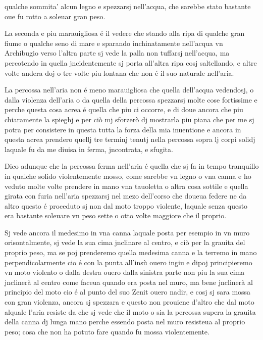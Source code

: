 \documentclass[11pt,a4paper]{article}
\begin{document}

qualche sommita' alcun legno e spezzarsj nell'acqua, che sarebbe stato bastante oue fu rotto a soleuar gran peso.

La seconda e piu marauigliosa é il vedere che stando alla ripa di qualche gran fiume o qualche seno di mare e sparando inchinatamente nell'acqua vn Archibugio verso l'altra parte sj vede la palla non tuffarsj nell'acqua, ma percotendo in quella jncidentemente sj porta all'altra ripa cosj saltellando, e altre volte andera doj o tre volte piu lontana che non é il suo naturale nell'aria.

La percossa nell'aria non é meno marauigliosa che quella dell'acqua vedendosj, o dalla violenza dell'aria o da quella della percossa spezzarsj molte cose fortissime e perche questa cosa \struck{\ill{}} acrea é quella che piu ci occorre, e di doue ancora che piu chiaramente la spieghj e per ciò mj sforzerò dj mostrarla piu piana che per me sj potra per consistere in questa tutta la forza della mia inuentione e ancora in questa acrea prendero quellj tre terminj tenutj nella percossa sopra lj corpi solidj laquale fu da me diuisa in ferma, jncontrata, e sfugita.

Dico adunque che la percossa ferma nell'aria é quella che sj fa in tempo tranquillo in qualche solido violentemente mosso, come sarebbe vn legno o vna canna e ho veduto molte volte prendere in mano vna tauoletta o altra cosa sottile e quella girata con furia nell'aria spezzarsj nel mezo dell'corso che doueua federe ne da altro questo é proceduto sj non dal moto troppo violente, laquale senza questo era bastante soleuare vn peso sette o otto volte maggiore che il proprio.

Sj vede ancora il medesimo in vna canna laquale posta per esempio in vn muro orisontalmente, sj vede la sua cima jnclinare al centro, e ciò per la grauita del proprio peso, ma se poj prenderemo quella medesima canna e la terremo in mano perpendicolarmente cio é con la punta all'insù ouero ingiu e dipoj principieremo vn moto violento o dalla destra ouero dalla sinistra parte non piu la sua cima jnclinerà al centro come faceua quando era posta nel muro, ma bene jnclinerà al principio del moto cio é al punto del suo Zenit ouero nadir, e cosj sj sara mossa con gran violenza, ancora sj spezzara e questo non prouiene d'altro che dal moto alquale l'aria resiste da che sj vede che il moto o sia la percossa supera la grauita della canna dj lunga mano perche essendo posta nel muro resisteua al proprio peso; cosa che non ha potuto fare quando fu mossa violentemente.
\end{document}
